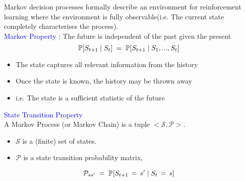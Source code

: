 \documentclass[landscape]{article}
\def\tcb{\textcolor{blue}}
\begin{document}
\newpage
\newvgtitle{\tcb{Introduction to MDPs \& Markov Property}}
\LARGE
\vspace{-.5em}
\vspace{0.5cm}
Markov decision processes formally describe an environment for reinforcement learning where the environment is fully observable(i.e. The current state completely characterises the process).\\
\vspace{1.5cm}
\huge \tcb{Markov Property}
\LARGE
: The future is independent of the past given the present
\begin{equation}\notag
    \mathbb{P}[S_{t+1} \;|\; S_t]\;=\; \mathbb{P}[S_{t+1} \;|\; S_1, ... ,S_t]
\end{equation}
\begin{itemize}
    \item The state captures all relevant information from the history
    \item Once the state is known, the history may be thrown away
    \item i.e. The state is a sufficient statistic of the future
\end{itemize}
\huge \tcb{State Transition Property}
\LARGE
\\A Markov Process (or Markov Chain) is a tuple $<\mathcal{S}, \mathcal{P}>$.\\
\begin{itemize}
    \item $\mathcal{S}$ is a (finite) set of states.\\
    \item $\mathcal{P}$ is a state transition probability matrix,
\end{itemize}
\begin{equation}\notag
    \mathcal{P}_{ss'}\;=\; \mathbb{P}[S_{t+1}\,=\,s' \;|\; S_{t}\,=\,s]
\end{equation}

\vspace{0.5cm}
\end{document}

